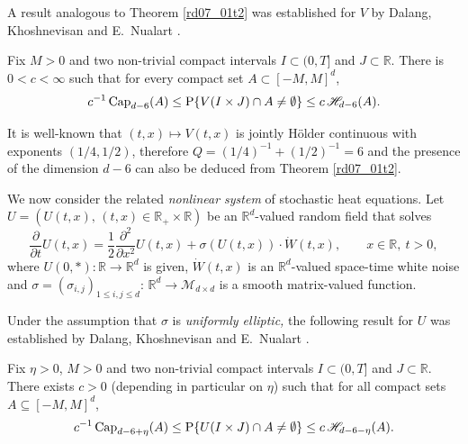 \documentclass[12pt,a4paper]{article}
\newcommand{\R}{{\mathbb{R}}}
\newcommand{\MM}{\mathcal{M}}
\renewcommand{\P}{\mathrm{P}}
\newcommand{\<}{\langle}
\renewcommand{\>}{\rangle}
\begin{document}
A result analogous to Theorem \ref{rd07_01t2} was established for $V$ by Dalang, Khoshnevisan and E.~Nualart \cite{DKN07}.

\begin{theorem}\label{rd07_01t4}
Fix $M > 0$ and  two non-trivial compact intervals  $I \subset (0, T] $ and $J \subset \R$. There is $0<c<\infty$ such that for every compact set $A\subset [-M, M]^d$,
\begin{equation}\label{rd07_01e8}
   c^{-1}\, \mbox{\rm Cap}_{d-6}(A) \leq \P\{V(I \times J) \cap A \neq \emptyset\} \leq c\, \mathscr{H}_{d-6}(A).
\end{equation}
\end{theorem}

It is well-known \cite[Section 3.2.2]{dss} that $(t, x) \mapsto V(t, x)$ is jointly H\"older continuous with exponents $(1/4, 1/2)$, therefore $Q = (1/4)^{-1} + (1/2)^{-1} = 6$ and the presence of the dimension $d-6$  can also be deduced from Theorem \ref{rd07_01t2}.

We now consider the related {\em nonlinear system} of stochastic heat equations. Let $U = (U(t,x),\,(t,x) \in \R_+ \times \R)$ be an $\R^d$-valued random field that solves 
\begin{equation}\label{rd07_01e6}
   \frac{\partial}{\partial t}  U(t,x) = \frac12\frac{\partial^2}{\partial x^2} U(t,x) +\sigma(U(t, x)) \cdot \dot W(t,x), \qquad x \in \R,\ t >0,
\end{equation}
where $U(0, *): \R \to \R^d$ is given, $\dot W(t,x)$ is an $\R^d$-valued space-time white noise and ${\sigma}=(\sigma_{i, j})_{1\leq i, j\leq d}$: $\R^d \to \MM_{d \times d}$ is a smooth matrix-valued function.

Under the assumption that $\sigma$ is {\em uniformly elliptic,} the following result for $U$ was established by Dalang, Khoshnevisan and E.~Nualart \cite{DKN09}.

\begin{theorem}\label{rd07_01t5} 
 Fix  $\eta>0$, $M > 0$ and  two non-trivial compact intervals  $I \subset (0, T] $ and $J \subset \R$.
There exists $c>0$ (depending in particular on $\eta$)  such that for all compact sets $A \subseteq [-M, M]^d$,
\begin{equation}\label{rd07_01e7}
c^{-1} \,  \textnormal{Cap}_{d-6+\eta}(A) \leq \P \{ U(I \times J) \cap A \neq
\emptyset \}  \leq c \, \mathscr{H}_{d-6-\eta}(A).
\end{equation}
\end{theorem}
\end{document}
